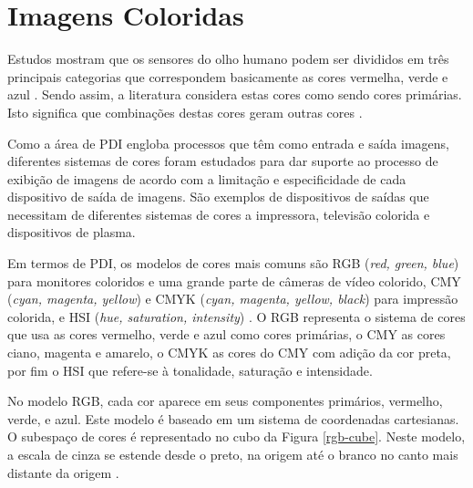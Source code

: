 \section{Imagens Coloridas}
Estudos mostram que os sensores do olho humano podem ser divididos em três principais categorias que correspondem basicamente as cores vermelha, verde e azul \cite{fundamentalsofmultimedia}. Sendo assim, a literatura considera estas cores como sendo cores primárias. Isto significa que combinações destas cores geram outras cores \cite{fundamentalsofdigitalimageprocessing}. 

Como a área de PDI engloba processos que têm como entrada e saída imagens, diferentes sistemas de cores foram estudados para dar suporte ao processo de exibição de imagens de acordo com a limitação e especificidade de cada dispositivo de saída de imagens. São exemplos de dispositivos de saídas que necessitam de diferentes sistemas de cores a impressora, televisão colorida e dispositivos de plasma.

Em termos de PDI, os modelos de cores mais comuns são RGB (\emph{red, green, blue}) para monitores coloridos e uma grande parte de câmeras de vídeo colorido, CMY (\emph{cyan, magenta, yellow}) e CMYK (\emph{cyan, magenta, yellow, black}) para impressão colorida, e HSI (\emph{hue, saturation, intensity}) \cite{Gonzalez:2006:DIP:1076432}. O RGB representa o sistema de cores que usa as cores vermelho, verde e azul como cores primárias, o CMY as cores ciano, magenta e amarelo, o CMYK as cores do CMY com adição da cor preta, por fim o HSI que refere-se à tonalidade, saturação e intensidade.

No modelo RGB, cada cor aparece em seus componentes primários, vermelho, verde, e azul. Este modelo é baseado em um sistema de coordenadas cartesianas. O subespaço de cores é representado no cubo da Figura \ref{rgb-cube}. Neste modelo, a escala de cinza se estende desde o preto, na origem até o branco no canto mais distante da origem \cite{fundamentalsofmultimedia}.


